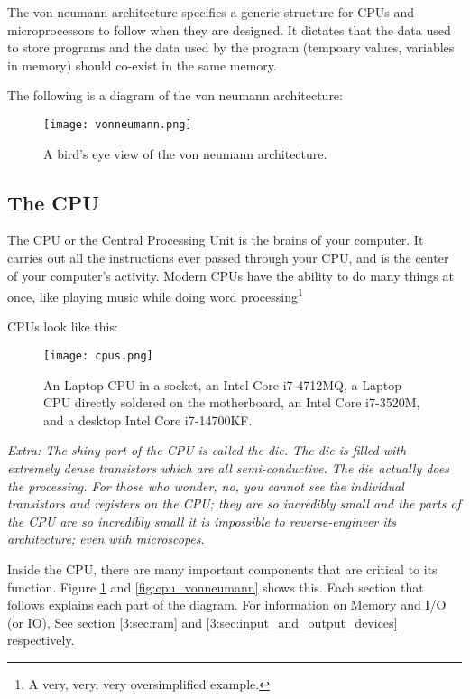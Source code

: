 \documentclass[../main.tex]{subfiles}
\begin{document}
The von neumann architecture specifies a generic structure for CPUs and microprocessors to follow when they are designed. It dictates that the data used to store programs and the data used by the program (tempoary values, variables in memory) should co-exist in the same memory.

The following is a diagram of the von neumann architecture:

\begin{figure}[H]
    \centering
    \texttt{[image: vonneumann.png]}
    \caption{A bird's eye view of the von neumann architecture.}
    \label{fig:vonneumann}
\end{figure}

\subsection{The CPU}
\label{3:sec:cpu}

The CPU or the Central Processing Unit is the brains of your computer. It carries out all the instructions ever passed through your CPU, and is the center of your computer's activity. Modern CPUs have the ability to do many things at once, like playing music while doing word processing\footnote{A very, very, very oversimplified example.}

CPUs look like this:

\begin{figure}[H]
    \centering
    \texttt{[image: cpus.png]}
    \caption{An Laptop CPU in a socket, an Intel Core i7-4712MQ, a Laptop CPU directly soldered on the motherboard, an Intel Core i7-3520M, and a desktop Intel Core i7-14700KF.}
    \label{fig:cpus}
\end{figure}

\emph{Extra: The shiny part of the CPU is called the die. The die is filled with extremely dense transistors which are all semi-conductive. The die actually does the processing. For those who wonder, no, you cannot see the individual transistors and registers on the CPU; they are so incredibly small and the parts of the CPU are so incredibly small it is impossible to reverse-engineer its architecture; even with microscopes}.

Inside the CPU, there are many important components that are critical to its function. Figure \ref{fig:vonneumann} and \ref{fig:cpu_vonneumann} shows this. Each section that follows explains each part of the diagram. For information on Memory and I/O (or IO), See section \ref{3:sec:ram} and \ref{3:sec:input_and_output_devices} respectively.
\end{document}

